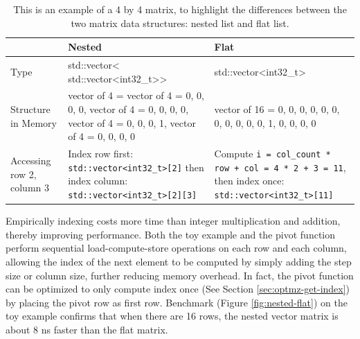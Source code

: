 \documentclass[logo,bsc,singlespacing,parskip]{infthesis}
\newenvironment{VerbatimCompact}
  {\vspace*{-2.5mm}\VerbatimEnvironment
   \par\Verbatim}
  {\endVerbatim\vspace*{-2.4mm}}
\begin{document}
\begin{table}[ht]
\captionsetup{justification=centering}
\begin{tabular}{%
    >{\raggedright\arraybackslash}p{2cm}%
    >{\raggedright\arraybackslash}p{6.5cm}%
    >{\raggedright\arraybackslash}p{4.5cm}}
    
    \toprule
    & Nested & Flat\\

    \midrule
    
    Type
    &
    \begin{VerbatimCompact}
std::vector<
    std::vector<int32_t>>
    \end{VerbatimCompact}
    &
    \begin{VerbatimCompact}
std::vector<int32_t>
    \end{VerbatimCompact}
    \\

Structure in Memory
    &
    \begin{VerbatimCompact}
vector of 4 = {
    vector of 4 = {0, 0, 0, 0}, 
    vector of 4 = {0, 0, 0, 0}, 
    vector of 4 = {0, 0, 0, 1}, 
    vector of 4 = {0, 0, 0, 0}
}
    \end{VerbatimCompact}
    &
    \begin{VerbatimCompact}
vector of 16 = {
    0, 0, 0, 0, 
    0, 0, 0, 0,
    0, 0, 0, 1, 
    0, 0, 0, 0
}
    \end{VerbatimCompact}
    \\

    Accessing row 2, column 3
    &
    Index row first: \texttt{std::vector<int32\_t>[2]} \linebreak
    then index column: 
        \texttt{std::vector<int32\_t>[2][3]}
    & 
    Compute \texttt{i = 
    \linebreak col\_count * row + col \linebreak = 4 * 2 + 3 =
    11}, \linebreak then index once: \texttt{std::vector<int32\_t>[11]}  \\

    \bottomrule

\end{tabular}
\caption{This is an example of a 4 by 4 matrix, to highlight the differences
between the two matrix data structures: nested list and flat list. }
\label{table:nested-flat}
\end{table}

Empirically indexing costs more time than integer multiplication and addition,
thereby improving performance. Both the toy example and the pivot function
perform sequential load-compute-store operations on each row and each column,
allowing the index of the next element to be computed by simply adding the step
size or column size, further reducing memory overhead. In fact, the pivot
function can be optimized to only compute index once (See Section
\ref{sec:optmz-get-index}) by placing the pivot row as first row. Benchmark
(Figure \ref{fig:nested-flat}) on the toy example confirms that when there are
16 rows, the nested vector matrix is about 8 ns faster than the flat matrix.
\end{document}
